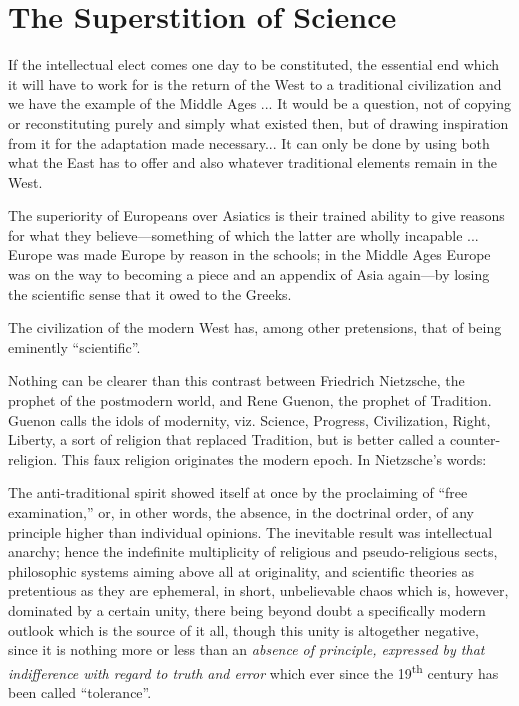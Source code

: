 \section{The Superstition of Science}

If the intellectual elect comes one day to be constituted, the essential end which it will have to work for is the return of the West to a traditional civilization and we have the example of the Middle Ages ... It would be a question, not of copying or reconstituting purely and simply what existed then, but of drawing inspiration from it for the adaptation made necessary... It can only be done by using both what the East has to offer and also whatever traditional elements remain in the West.

\begin{quotex}
The superiority of Europeans over Asiatics is their trained ability to give reasons for what they believe---something of which the latter are wholly incapable ... Europe was made Europe by reason in the schools; in the Middle Ages Europe was on the way to becoming a piece and an appendix of Asia again---by losing the scientific sense that it owed to the Greeks.

The civilization of the modern West has, among other pretensions, that of being eminently ``scientific''.
\end{quotex}

Nothing can be clearer than this contrast between Friedrich Nietzsche, the prophet of the postmodern world, and Rene Guenon, the prophet of Tradition. Guenon calls the idols of modernity, viz. Science, Progress, Civilization, Right, Liberty, a sort of religion that replaced Tradition, but is better called a counter-religion. This faux religion originates the modern epoch. In Nietzsche's words:

\begin{quotex}
The anti-traditional spirit showed itself at once by the proclaiming of ``free examination,'' or, in other words, the absence, in the doctrinal order, of any principle higher than individual opinions. The inevitable result was intellectual anarchy; hence the indefinite multiplicity of religious and pseudo-religious sects, philosophic systems aiming above all at originality, and scientific theories as pretentious as they are ephemeral, in short, unbelievable chaos which is, however, dominated by a certain unity, there being beyond doubt a specifically modern outlook which is the source of it all, though this unity is altogether negative, since it is nothing more or less than an \emph{absence of principle, expressed by that indifference with regard to truth and error} which ever since the 19\textsuperscript{th} century has been called ``tolerance''.
\end{quotex}


